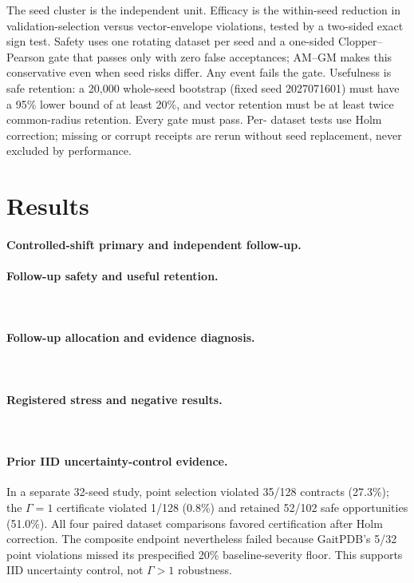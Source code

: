 The seed cluster is the independent unit. Efficacy is the within-seed reduction
in validation-selection versus vector-envelope violations, tested by a
two-sided exact sign test. Safety uses one rotating dataset per seed and a
one-sided Clopper--Pearson gate that passes only with zero false acceptances;
AM--GM makes this conservative even when seed risks differ. Any event fails the
gate. Usefulness is safe retention: a 20,000 whole-seed bootstrap (fixed seed
2027071601) must have a 95\% lower bound of at least 20\%, and vector retention
must be at least twice common-radius retention. Every gate must pass. Per-
dataset tests use Holm correction; missing or corrupt receipts are rerun
without seed replacement, never excluded by performance.

\section{Results}

\paragraph{Controlled-shift primary and independent follow-up.}
\ControlledPrimaryResult

\paragraph{Follow-up safety and useful retention.}
\ControlledSafetyResult\ \ControlledRetentionResult

\ControlledMainResultTable
\ControlledMainResultFigure

\paragraph{Follow-up allocation and evidence diagnosis.}
\ControlledAllocationResult\ \ControlledEvidenceResult

\paragraph{Registered stress and negative results.}
\ControlledHeldoutResult\ \ControlledGaitResult\ \ControlledNegativeResults

\paragraph{Prior IID uncertainty-control evidence.}
In a separate 32-seed study, point selection violated 35/128 contracts (27.3\%);
the $\Gamma=1$ certificate violated 1/128 (0.8\%) and retained 52/102 safe
opportunities (51.0\%). All four paired dataset comparisons favored
certification after Holm correction. The composite endpoint nevertheless
failed because GaitPDB's 5/32 point violations missed its prespecified 20\%
baseline-severity floor. This supports IID uncertainty control, not
$\Gamma>1$ robustness.

